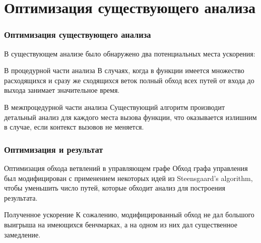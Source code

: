 \documentclass[utf8,russian]{beamer}
\begin{document}
\section{Оптимизация существующего анализа}

\begin{frame}
\frametitle{Оптимизация существующего анализа}

\begin{block}{}
В существующем анализе было обнаружено два потенциальных места ускорения:
\end{block}

\begin{block}{В процедурной части анализа}
В случаях, когда в функции имеется множество расходящихся и сразу же сходящихся веток полный обход всех путей от входа до выхода занимает значительное время.
\end{block}

\begin{block}{В межпроцедурной части анализа}
Существующий алгоритм производит детальный анализ для каждого места вызова функции, что оказывается излишним в случае, если контекст вызовов не меняется.
\end{block}

\end{frame}


\begin{frame}
\frametitle{Оптимизация и результат}

\begin{block}{Оптимизация обхода ветвлений в управляющем графе}
Обход графа управления был модифицирован с применением некоторых идей из Steensgaard’s algorithm, чтобы уменьшить число путей, которые обходит анализ для построения результата.
\end{block}

\begin{block}{Полученное ускорение}
К сожалению, модифицированный обход не дал большого выигрыша на имеющихся бенчмарках, а на одном из них дал существенное замедление.
\end{block}

\end{frame}

\end{document}
